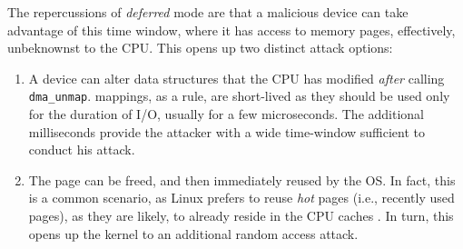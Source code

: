 The repercussions of \emph{deferred} mode are that a malicious device can take advantage of this time window, where it has access to memory pages, effectively, unbeknownst to the CPU. This opens up two distinct attack options:

\begin{enumerate}
    \item A device can alter data structures that the CPU has modified \emph{after} calling \texttt{dma\_unmap}.
    \iova{} mappings, as a rule, are short-lived as they should be used only for the duration of I/O, usually for a few microseconds. The additional milliseconds provide the attacker with a wide time-window sufficient to conduct his attack.
    \item The page can be freed, and then immediately reused by the OS. In fact, this is a common scenario, as Linux prefers to reuse \emph{hot} pages (i.e., recently used pages), as they are likely, to already reside in the CPU caches \cite{hotcold}. In turn, this opens up the kernel to an additional random access attack.
\end{enumerate}

